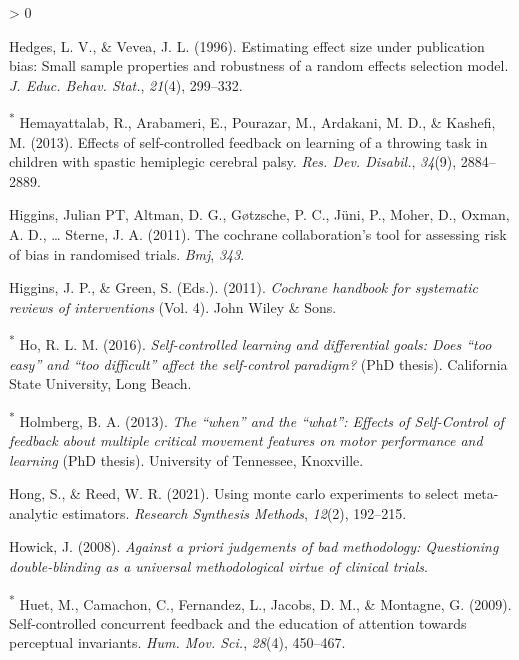 \documentclass[
  english,
  man,floatsintext]{apa7}
\newlength{\cslhangindent}
\newenvironment{CSLReferences}[2] %
 {%
  \setlength{\parindent}{0pt}
  \ifodd #1 \everypar{\setlength{\hangindent}{\cslhangindent}}\ignorespaces\fi
  \ifnum #2 > 0
  \setlength{\parskip}{#2\baselineskip}
  \fi
 }%
 {}
\begin{document}
\begin{CSLReferences}{1}{0}
\leavevmode\hypertarget{ref-Hedges1996-yh}{}%
Hedges, L. V., \& Vevea, J. L. (1996). Estimating effect size under publication bias: Small sample properties and robustness of a random effects selection model. \emph{J. Educ. Behav. Stat.}, \emph{21}(4), 299--332.

\leavevmode\hypertarget{ref-Hemayattalab2013-mq}{}%
\textsuperscript{*} Hemayattalab, R., Arabameri, E., Pourazar, M., Ardakani, M. D., \& Kashefi, M. (2013). Effects of self-controlled feedback on learning of a throwing task in children with spastic hemiplegic cerebral palsy. \emph{Res. Dev. Disabil.}, \emph{34}(9), 2884--2889.

\leavevmode\hypertarget{ref-higgins2011}{}%
Higgins, Julian PT, Altman, D. G., Gøtzsche, P. C., Jüni, P., Moher, D., Oxman, A. D., \ldots{} Sterne, J. A. (2011). The cochrane collaboration's tool for assessing risk of bias in randomised trials. \emph{Bmj}, \emph{343}.

\leavevmode\hypertarget{ref-Higgins2011-rg}{}%
Higgins, J. P., \& Green, S. (Eds.). (2011). \emph{Cochrane handbook for systematic reviews of interventions} (Vol. 4). John Wiley \& Sons.

\leavevmode\hypertarget{ref-Ho2016-on}{}%
\textsuperscript{*} Ho, R. L. M. (2016). \emph{Self-controlled learning and differential goals: Does {``too easy''} and {``too difficult''} affect the self-control paradigm?} (PhD thesis). California State University, Long Beach.

\leavevmode\hypertarget{ref-Holmberg2013-qk}{}%
\textsuperscript{*} Holmberg, B. A. (2013). \emph{The {``when''} and the {``what''}: Effects of {Self-Control} of feedback about multiple critical movement features on motor performance and learning} (PhD thesis). University of Tennessee, Knoxville.

\leavevmode\hypertarget{ref-hong2021}{}%
Hong, S., \& Reed, W. R. (2021). Using monte carlo experiments to select meta-analytic estimators. \emph{Research Synthesis Methods}, \emph{12}(2), 192--215.

\leavevmode\hypertarget{ref-howick2008}{}%
Howick, J. (2008). \emph{Against a priori judgements of bad methodology: Questioning double-blinding as a universal methodological virtue of clinical trials}.

\leavevmode\hypertarget{ref-Huet2009-wu}{}%
\textsuperscript{*} Huet, M., Camachon, C., Fernandez, L., Jacobs, D. M., \& Montagne, G. (2009). Self-controlled concurrent feedback and the education of attention towards perceptual invariants. \emph{Hum. Mov. Sci.}, \emph{28}(4), 450--467.


\end{CSLReferences}
\end{document}
